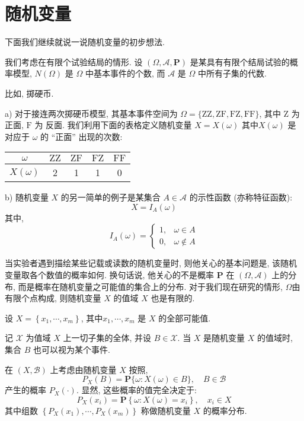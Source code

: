\section{随机变量}
下面我们继续就说一说随机变量的初步想法. 

我们考虑在有限个试验结局的情形. 设 $(\Omega, \mathscr{A}, \mathbf{P})$ 是某具有有限个结局试验的概率模型, $N(\Omega)$ 是 $\Omega$ 中基本事件的个数, 而 $\mathscr{A}$ 是 $\Omega$ 中所有子集的代数. 

比如, 掷硬币. 

\begin{example}
    a) 对于接连两次掷硬币模型, 其基本事件空间为 $\Omega=\{\mathrm{ZZ}, \mathrm{ZF}, \mathrm{FZ}, \mathrm{FF}\}$, 其中 $\mathrm{Z}$ 为 正面, $\mathrm{F}$ 为 反面. 我们利用下面的表格定义随机变量 $X=X(\omega)$ 其中$X(\omega)$ 是对应于 $\omega$ 的 ``正面'' 出现的次数:
    \begin{tabular}{c|c|c|c|c}
        \hline$\omega$ & $\mathrm{ZZ}$ & $\mathrm{ZF}$ & $\mathrm{FZ}$ & $\mathrm{FF}$ \\
        \hline$X(\omega)$ & 2 & 1 & 1 & 0 \\
        \hline
        \end{tabular}

        b) 随机变量 $X$ 的另一简单的例子是某集合 $A \in \mathscr{A}$ 的示性函数 (亦称特征函数):
        $$
        X=I_A(\omega)
        $$其中, $$
        I_A(\omega)= \begin{cases}1, & \omega \in A \\ 0, & \omega \notin A\end{cases}
        $$
\end{example}

当实验者遇到描绘某些记载或读数的随机变量时, 则他关心的基本问题是, 该随机
变量取各个数值的概率如何. 换句话说, 他关心的不是概率 $\mathbf{P}$ 在 $(\Omega, \mathscr{A})$ 上的分布, 而是概率在随机变量之可能值的集合上的分布. 对于我们现在研究的情形, $\Omega$由有限个点构成, 则随机变量 $X$ 的值域 $X$ 也是有限的.

设 $X=\left\{x_1, \cdots, x_m\right\}$, 其中$x_1, \cdots, x_m$ 是 $X$ 的全部可能值.

记 $\mathscr{X}$ 为值域 $X$ 上一切子集的全体, 并设 $B \in \mathscr{X}$. 当 $X$ 是随机变量 $X$ 的值域时, 集合 $B$ 也可以视为某个事件.

在 $(X, \mathscr{B})$ 上考虑由随机变量 $X$ 按照,
$$
P_{X}(B)=\mathbf{P}\{\omega: X(\omega) \in B\}, \quad B \in \mathscr{B}
$$
产生的概率 $P_{X}(\cdot)$. 显然, 这些概率的值完全决定于:
$$
P_{X}\left(x_i\right)=\mathbf{P}\left\{\omega: X(\omega)=x_i\right\}, \quad x_i \in X
$$
其中组数 $\left\{P_{X}\left(x_1\right), \cdots, P_{X}\left(x_m\right)\right\}$ 称做随机变量 $X$ 的概率分布.

